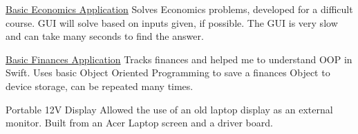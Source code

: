 \documentclass[11pt,letterpaper]{article}
\newenvironment{indentsection}[1]%
{\begin{list}{}%
	{\setlength{\leftmargin}{#1}}%
	\item[]%
}
{\end{list}}
\begin{document}
\begin{indentsection}{\parindent}
\begin{description*}
	\item[\href{https://github.com/jeremyggiese/jgieseRepo/tree/master/Economics}{Basic Economics Application}]
	Solves Economics problems, developed for a difficult course. GUI will solve based on inputs given, if possible. The GUI is very slow and can take many seconds to find the answer.
	\item[\href{https://github.com/jeremyggiese/jgieseRepo/tree/master/iOS/Finances}{Basic Finances Application}]
	Tracks finances and helped me to understand OOP in Swift. Uses basic Object Oriented Programming to save a finances Object to device storage, can be repeated many times.
	\item[Portable 12V Display]
	Allowed the use of an old laptop display as an external monitor. Built from an Acer Laptop screen and a driver board.
		
\end{description*}
\end{indentsection}

%
\end{document}
